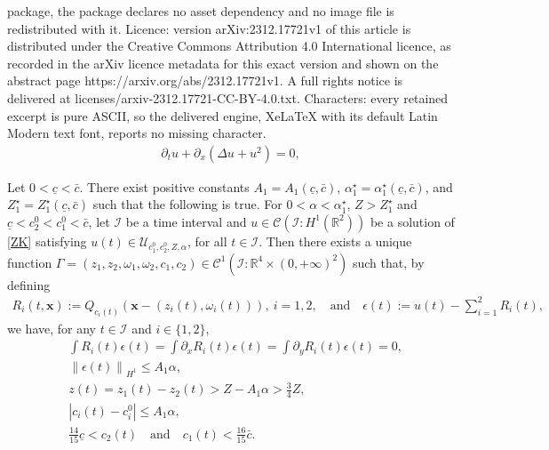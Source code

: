\documentclass[10pt,a4paper]{amsart}
\newcommand{\bx}{\mathbf{x}}
\begin{document}
package, the package declares no asset dependency and no image file is redistributed with it. Licence: version arXiv:2312.17721v1 of this article is distributed under the Creative Commons Attribution 4.0 International licence, as recorded in the arXiv licence metadata for this exact version and shown on the abstract page https://arxiv.org/abs/2312.17721v1. A full rights notice is delivered at licenses/arxiv-2312.17721-CC-BY-4.0.txt. Characters: every retained excerpt is pure ASCII, so the delivered engine, XeLaTeX with its default Latin Modern text font, reports no missing character.
	\begin{align}\label{ZK}%
		\partial_t u + \partial_x \left( \Delta u + u^2 \right)=0, 
	\end{align}

	\begin{propo}\label{propo:choice_mod_param}
		Let $0<\underline{c}<\bar{c}$. There exist positive constants $A_1=A_1(\underline{c},\bar{c})$, $\alpha_1^\star=\alpha_1^\star(\underline{c},\bar{c})$, and $Z_1^\star =Z_1^\star(\underline{c},\bar{c})$ such that the following is true. For $0<\alpha< \alpha_1^\star$, $Z>Z_1^\star$ and $\underline{c}<c_2^0<c_1^0<\bar{c}$, let $\mathcal{I}$ be a time interval and $u\in \mathcal{C}(\mathcal{I} : H^1(\mathbb{R}^2))$ be a solution of \eqref{ZK} satisfying $u(t) \in \mathcal{U}_{c_1^0, c_2^0, Z, \alpha}$, for all $t \in \mathcal{I}$.
		Then there exists a unique function $\Gamma=\left(z_1,z_2,\omega_1,\omega_2,c_1,c_2\right) \in \mathcal{C}^1\left(\mathcal{I} : \mathbb{R}^4 \times (0,+\infty)^2\right)$ such that, by defining
		\begin{align}\label{defi:R_n}
			R_i(t,\bx) := Q_{c_i(t)} \left( \bx - \left( z_i(t), \omega_i(t)\right) \right), \ i=1,2, \quad \text{and} \quad \epsilon(t) :=  u(t) - \sum_{i=1}^2 R_i(t) ,
		\end{align}
		we have, for any $t \in \mathcal{I}$ and $i\in \{ 1,2\}$,
		\begin{align}
			& \int R_i(t) \epsilon(t) = \int \partial_x  R_i(t) \epsilon(t) = \int \partial_y  R_i(t)\epsilon(t) = 0, \label{eps:ortho} \\
			& \left\| \epsilon (t) \right\|_{H^1} \leq A_1 \alpha, \label{estimate_modulation:eps} \\ & z(t)= z_1(t)- z_2(t) > Z - A_1 \alpha>\frac{3}4Z, \label{estimate_modulation:z} \\
			&|c_i(t)-c_i^0| \le A_1 \alpha, \label{estimate_modulation:c} \\
            &  \frac{14}{15}\underline{c} < c_2(t) \quad \text{and} \quad c_1(t) < \frac{16}{15}\bar{c}. \label{estimate_modulation:c:bis}
		\end{align}
	\end{propo}
\end{document}
